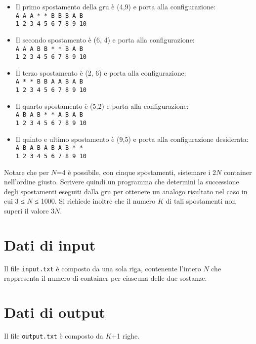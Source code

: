 \documentclass[a4paper,11pt]{article}
\begin{document}
\begin{itemize}
  
    \item Il primo spostamento della gru è (4,9) e porta alla configurazione:\\
    \texttt{A A A * * B B B A B}\\
    \texttt{1 2 3 4 5 6 7 8 9 10}
    \item Il secondo spostamento è (6, 4) e porta alla configurazione:\\
    \texttt{A A A B B * * B A B}\\
    \texttt{1 2 3 4 5 6 7 8 9 10}
    \item Il terzo spostamento è (2, 6) e porta alla configurazione:\\
    \texttt{A * * B B A A B A B}\\
    \texttt{1 2 3 4 5 6 7 8 9 10}
    \item Il quarto spostamento è (5,2) e porta alla configurazione:\\
    \texttt{A B A B * * A B A B}\\
    \texttt{1 2 3 4 5 6 7 8 9 10}
    \item Il quinto e ultimo spostamento è (9,5) e porta alla configurazione desiderata:\\
    \texttt{A B A B A B A B * *}\\
    \texttt{1 2 3 4 5 6 7 8 9 10}
\end{itemize}


Notare che per $N$=4 è possibile, con cinque
spostamenti, sistemare i 2$N$ container nell'ordine
giusto. Scrivere quindi un programma che determini la successione
degli spostamenti eseguiti dalla gru per ottenere un analogo risultato
nel caso in cui 3 ≤ $N$ ≤ 1000. Si richiede inoltre che
il numero $K$ di tali spostamenti non superi il valore
3$N$.


\section*{Dati di input}
  
Il file \texttt{input.txt} è composto da una sola riga,
contenente l'intero $N$ che rappresenta il numero di
container per ciascuna delle due sostanze.


\section*{Dati di output}
  
Il file \texttt{output.txt} è composto da $K$+1
righe.
\end{document}
